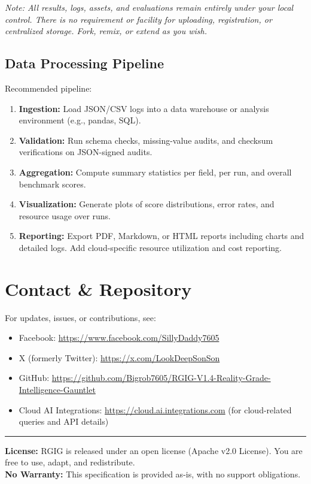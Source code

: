 \documentclass[11pt]{article}
\begin{document}
\noindent\emph{Note: All results, logs, assets, and evaluations remain entirely under your local control. There is no requirement or facility for uploading, registration, or centralized storage. Fork, remix, or extend as you wish.}

\subsection*{Data Processing Pipeline}
Recommended pipeline:
\begin{enumerate}
  \item \textbf{Ingestion:}  Load JSON/CSV logs into a data warehouse or analysis environment (e.g., pandas, SQL).
  \item \textbf{Validation:}  Run schema checks, missing-value audits, and checksum verifications on JSON-signed audits.
  \item \textbf{Aggregation:}  Compute summary statistics per field, per run, and overall benchmark scores.
  \item \textbf{Visualization:}  Generate plots of score distributions, error rates, and resource usage over runs.
  \item \textbf{Reporting:}  Export PDF, Markdown, or HTML reports including charts and detailed logs. Add cloud-specific resource utilization and cost reporting.
\end{enumerate}

\section*{Contact \& Repository}
For updates, issues, or contributions, see:
\begin{itemize}
  \item Facebook: \url{https://www.facebook.com/SillyDaddy7605}
  \item X (formerly Twitter): \url{https://x.com/LookDeepSonSon}
  \item GitHub: \url{https://github.com/Bigrob7605/RGIG-V1.4-Reality-Grade-Intelligence-Gauntlet}
  \item Cloud AI Integrations: \url{https://cloud.ai.integrations.com} (for cloud-related queries and API details)
\end{itemize}

\noindent\rule{\linewidth}{0.5pt}
\noindent\textbf{License:} RGIG is released under an open license (Apache v2.0 License). You are free to use, adapt, and redistribute.\\
\noindent\textbf{No Warranty:} This specification is provided as-is, with no support obligations.
\end{document}

